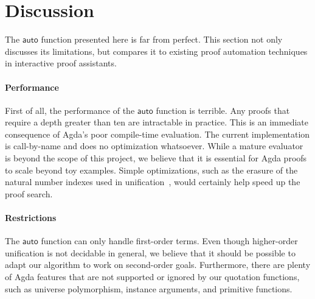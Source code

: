 \documentclass[preprint]{sigplanconf}
\newcommand{\Varid}[1]{\mathit{#1}}
\renewcommand\Varid[1]{\mathord{\textsf{#1}}}
\begin{document}
\section{Discussion}
\label{sec:discussion}

The \ensuremath{\Varid{auto}} function presented here is far from perfect. This section
not only discusses its limitations, but compares it to existing proof
automation techniques in interactive proof assistants.

\paragraph{Performance}
First of all, the performance of the \ensuremath{\Varid{auto}} function is terrible. Any
proofs that require a depth greater than ten are intractable in
practice. This is an immediate consequence of Agda's poor compile-time
evaluation. The current implementation is call-by-name and does no
optimization whatsoever. While a mature evaluator is beyond the scope
of this project, we believe that it is essential for Agda proofs to
scale beyond toy examples. Simple optimizations, such as the erasure
of the natural number indexes used in unification~\cite{brady-opt},
would certainly help speed up the proof search.

\paragraph{Restrictions}
The \ensuremath{\Varid{auto}} function can only handle first-order terms. Even though
higher-order unification is not decidable in general, we believe that it
should be possible to adapt our algorithm to work on second-order
goals.
Furthermore, there are plenty of Agda features that are not
supported or ignored by our quotation functions, such as universe
polymorphism, instance arguments, and primitive functions.
\end{document}
